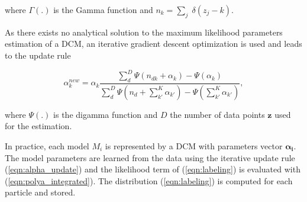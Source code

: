 where $\Gamma(.)$ is the Gamma function and $n_k=\sum_j\;\delta(z_j-k)$.

As there exists no analytical solution to the maximum likelihood parameters
estimation of a DCM, an iterative gradient descent optimization is used and
leads to the update rule

\begin{equation}
\label{eqn:alpha_update}
\alpha_k^{new} = \alpha_k\frac{\sum_d^D\Psi(n_{dk}+\alpha_k)-\Psi(\alpha_k)}
  {\sum_d^D\Psi(n_d+\sum_{k'}^K\alpha_{k'})-\Psi(\sum_{k'}^K\alpha_{k'})},
\end{equation}

where $\Psi(.)$ is the digamma function and $D$ the number of data points
$\mathbf{z}$ used for the estimation.

In practice, each model $M_i$ is represented by a DCM with parameters vector
$\boldsymbol{\alpha_i}$. The model parameters are learned from the data using
the iterative update rule (\ref{eqn:alpha_update}) and the likelihood term of
(\ref{eqn:labeling}) is evaluated with (\ref{eqn:polya_integrated}). The
distribution (\ref{eqn:labeling}) is computed for each particle and stored.
